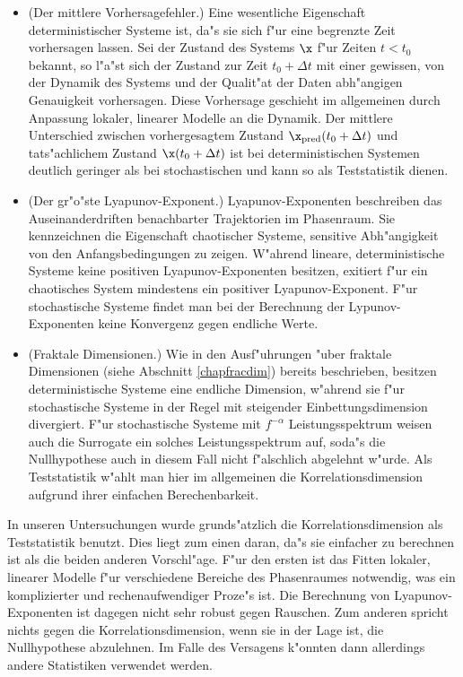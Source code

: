 \begin{itemize}
\item \rem(Der mittlere Vorhersagefehler.) Eine wesentliche Eigenschaft deterministischer 
  Systeme ist, da"s sie sich f"ur eine begrenzte Zeit vorhersagen lassen. Sei der Zustand
  des Systems $\x$ f"ur Zeiten $t<t_0$ bekannt, so l"a"st sich der Zustand zur Zeit
  $t_0+\Delta t$ mit einer gewissen, von der Dynamik des Systems und der Qualit"at der
  Daten abh"angigen Genauigkeit vorhersagen. Diese Vorhersage geschieht im allgemeinen
  durch Anpassung lokaler, linearer Modelle an die Dynamik. Der mittlere Unterschied zwischen vorhergesagtem Zustand
  $\x_\mathrm{pred}(t_0+\Delta t)$ und tats"achlichem Zustand $\x(t_0+\Delta t)$ ist bei
  deterministischen Systemen deutlich geringer als bei stochastischen und kann so als
  Teststatistik dienen. 
\item \rem(Der gr"o"ste Lyapunov-Exponent.) Lyapunov-Exponenten beschreiben das
  Auseinanderdriften benachbarter Trajektorien im Phasenraum. Sie kennzeichnen die
  Eigenschaft chaotischer Systeme, sensitive Abh"angigkeit von den
  Anfangsbedingungen zu zeigen. W"ahrend lineare, deterministische Systeme keine positiven
  Lya\-pu\-nov-Exponenten besitzen, exitiert f"ur ein chaotisches System mindestens ein
  positiver Lya\-pu\-nov-Exponent. F"ur stochastische Systeme findet man bei der Berechnung
  der Lypunov-Exponenten keine Konvergenz gegen endliche Werte.
\item \rem(Fraktale Dimensionen.) Wie in den Ausf"uhrungen "uber fraktale Dimensionen
  (siehe Abschnitt \ref{chapfracdim}) bereits
  beschrieben, besitzen deterministische Systeme eine endliche Dimension, w"ahrend sie
  f"ur stochastische Systeme in der Regel mit steigender Einbettungsdimension divergiert. F"ur
  stochastische Systeme mit $f^{-\alpha}$ Leistungsspektrum weisen auch die Surrogate
  ein solches Leistungsspektrum auf, soda"s die Nullhypothese auch in diesem Fall nicht f"alschlich
  abgelehnt w"urde. Als Teststatistik w"ahlt man hier im allgemeinen die
  Korrelationsdimension aufgrund ihrer einfachen Berechenbarkeit.
\end{itemize}
In unseren Untersuchungen wurde grunds"atzlich die Korrelationsdimension als Teststatistik 
benutzt. Dies liegt zum einen daran, da"s sie einfacher zu berechnen ist als die beiden
anderen Vorschl"age. F"ur den ersten ist das Fitten lokaler, linearer Modelle f"ur
verschiedene Bereiche des Phasenraumes notwendig, was ein komplizierter und
rechenaufwendiger Proze"s ist. Die Berechnung von Lyapunov-Exponenten ist dagegen nicht
sehr robust gegen Rauschen. Zum anderen spricht nichts gegen die Korrelationsdimension,
wenn sie in der Lage ist, die Nullhypothese abzulehnen. Im Falle des Versagens k"onnten
dann allerdings andere Statistiken verwendet werden. 

